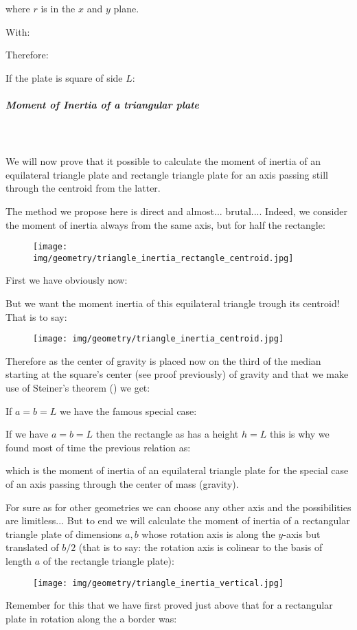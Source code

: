 {	where $r$ is in the $x$ and $y$ plane.
	
	With:
	
	Therefore:
	
	If the plate is square of side $L$:
	
	
	\pagebreak
	\subparagraph{Moment of Inertia of a triangular plate}\mbox{}\\\\
	We will now prove that it possible to calculate the moment of inertia of an equilateral triangle plate and rectangle triangle plate for an axis passing still through the centroid from the latter.
	
	The method we propose here is direct and almost... brutal.... Indeed, we consider the moment of inertia always from the same axis, but for half the rectangle:
	\begin{figure}[H]
		\centering
		\texttt{[image: img/geometry/triangle\_inertia\_rectangle\_centroid.jpg]}
	\end{figure}	
	 First we have obviously now:
	
	But we want the moment inertia of this equilateral triangle trough its centroid! That is to say:
	\begin{figure}[H]
		\centering
		\texttt{[image: img/geometry/triangle\_inertia\_centroid.jpg]}
	\end{figure}
	Therefore as the center of gravity is placed now on the third of the median starting at the square's center (see proof previously) of gravity and that we make use of Steiner's theorem () we get:
	
	If $a=b=L$ we have the famous special case:
	
	If we have $a=b=L$ then the rectangle as has a height $h=L$ this is why we found most of time the previous relation as:
	
	which is the moment of inertia of an equilateral triangle plate for the special case of an axis passing through the center of mass (gravity).
	
	For sure as for other geometries we can choose any other axis and the possibilities are limitless... But to end we will calculate the moment of inertia of a rectangular triangle plate of dimensions $a,b$ whose rotation axis is along the $y$-axis but translated of $b/2$ (that is to say: the rotation axis is colinear to the basis of length $a$ of the rectangle triangle plate):
	\begin{figure}[H]
		\centering
		\texttt{[image: img/geometry/triangle\_inertia\_vertical.jpg]}
	\end{figure}
	Remember for this that we have first proved just above that for a rectangular plate in rotation along the a border was:
	
}
